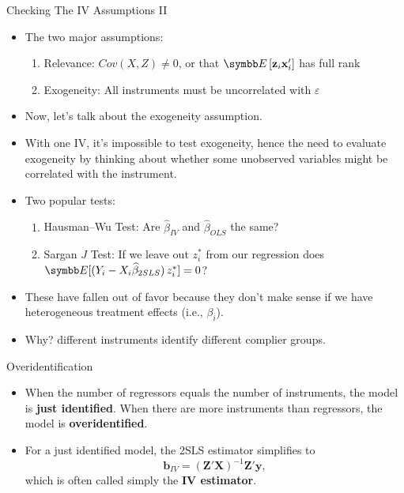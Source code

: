 \documentclass[aspectratio=169,11pt]{beamer}
\begin{document}
\begin{frame}{Checking The IV Assumptions II}

\begin{itemize}
\item The two major assumptions:
\begin{enumerate}
	\item Relevance: $Cov(X,Z)\ne 0$, or that $\E\left[{\bf z}_i {\bf x}_i' \right]$ has full rank

	\item Exogeneity: All instruments must be uncorrelated with $\varepsilon$
\end{enumerate}
\smallskip
	\item Now, let's talk about the exogeneity assumption.
	\item With one IV, it's impossible to test exogeneity, hence
	the need to evaluate exogeneity by thinking about whether
	some unobserved variables might be correlated with the instrument.
	\item Two popular tests:
	\begin{enumerate}
		\item Hausman--Wu Test: Are $\widehat{\beta}_{IV}$ and $\widehat{\beta}_{OLS}$ the same?
		\item Sargan $J$ Test: If we leave out $z_{i}^{*}$ from our regression does $\E[(Y_i -  X_i \widehat{\beta}_{2SLS})\, z_i^*]=0$?
	\end{enumerate}
	\item These have fallen out of favor because they don't make sense if we have \alert{heterogeneous treatment effects} (i.e., $\beta_i$).
	\item Why? \alert{different instruments} identify \alert{different complier} groups.
\end{itemize}
\end{frame}



\begin{frame}{Overidentification}
\begin{itemize}
	\item When the number of regressors equals the number of instruments,
	the model is {\bf just identified}. When there are
	more instruments than regressors, the model is {\bf overidentified}.

	\medskip
	\item For a just identified model, the 2SLS estimator simplifies to\[
	\mathbf{b}_{IV}=\left(\mathbf{Z}'\mathbf{X}\right)^{-1}\mathbf{Z}'\mathbf{y},
	\]
	which is often called simply the {\bf IV estimator}.

	\medskip
\end{itemize}
\end{frame}
\end{document}
